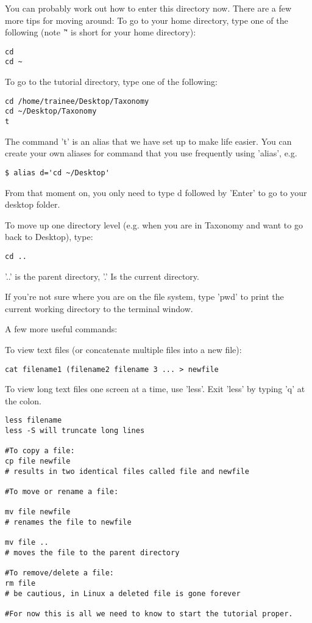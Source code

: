 \documentclass[a4paper,12pt,twoside]{memoir}
\begin{document}
\begin{steps}
You can probably work out how to enter this directory now. There are a few more tips for moving around:
To go to your home directory, type one of the following (note '\~' is short for your home directory):

\begin{lstlisting}
cd 
cd ~
\end{lstlisting}

To go to the tutorial directory, type one of the following:

\begin{lstlisting}
cd /home/trainee/Desktop/Taxonomy
cd ~/Desktop/Taxonomy
t
\end{lstlisting}

The command 't' is an alias that we have set up to make life easier. You can create your own aliases for command that you use frequently using 'alias', e.g.

\begin{lstlisting}
$ alias d='cd ~/Desktop'
\end{lstlisting}

From that moment on, you only need to type d followed by 'Enter' to go to your desktop folder.


To move up one directory level (e.g. when you are in Taxonomy and want to go back to Desktop), type:

\begin{lstlisting}
cd ..
\end{lstlisting}

'..' is the parent directory, '.' Is the current directory.

If you're not sure where you are on the file system, type 'pwd' to print the current working directory to the terminal window.

A few more useful commands:

To view text files (or concatenate multiple files into a new file):

\begin{lstlisting}
cat filename1 (filename2 filename 3 ... > newfile
\end{lstlisting}

To view long text files one screen at a time, use 'less'. Exit 'less' by typing 'q' at the colon.

\begin{lstlisting}
less filename
less -S will truncate long lines

#To copy a file:
cp file newfile       
# results in two identical files called file and newfile

#To move or rename a file:

mv file newfile       
# renames the file to newfile

mv file ..                
# moves the file to the parent directory

#To remove/delete a file:
rm file           
# be cautious, in Linux a deleted file is gone forever

#For now this is all we need to know to start the tutorial proper.
\end{lstlisting}
\end{steps}
\end{document}
